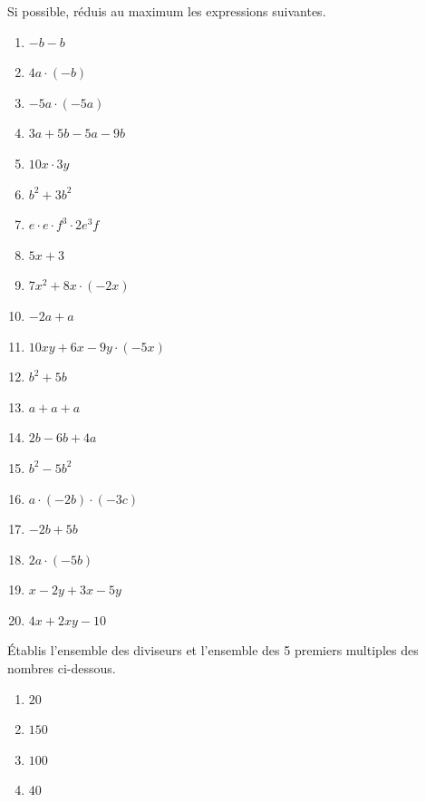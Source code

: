 \documentclass[10pt,a4paper]{article}
\begin{document}
\begin{exercise}
	Si possible, réduis au maximum les expressions suivantes. 
	\begin{enumerate}[cols=3]
		\item \(-b -b\)
		\item \(4a \cdot (-b)\)
		\item \(-5a\cdot (-5a)\)
		\item \(3a + 5b - 5a - 9b\)
		\item \(10x \cdot 3y\)
		\item \(b^2 + 3b^2\)
		\item \(e \cdot e \cdot f^3 \cdot 2e^3f\)
		\item \(5x + 3\)
		\item \(7x^2 + 8x \cdot (-2x)\)
		\item \(-2a + a \)
		\item \(10xy + 6x - 9y \cdot (-5x)\)
		\item \(b^2 + 5b\)
		\item \(a + a + a \)
		\item \(2b - 6b + 4a\)
		\item \(b^2 - 5b^2\)
		\item \(a \cdot (-2b)\cdot (-3c)\)
		\item \(-2b + 5b\)
		\item \(2a \cdot (-5b)\)
		\item \(x-2y + 3x - 5y\)
		\item \(4x + 2xy - 10\)
	\end{enumerate}
\end{exercise}

\begin{exercise}
	Établis l'ensemble des diviseurs et l'ensemble des 5 premiers multiples des nombres ci-dessous.
	\begin{enumerate}[cols=4]
		\item $20$
		\item $150$
		\item $100$
		\item $40$
	\end{enumerate}
\end{exercise} 
\end{document}
